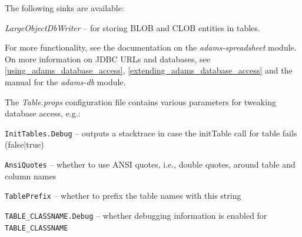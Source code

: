 \noindent The following sinks are available:
\begin{tight_itemize}
  \item \textit{LargeObjectDbWriter} -- for storing BLOB and CLOB entities in tables.
\end{tight_itemize}

For more functionality, see the documentation on the \textit{adams-spreadsheet}
module. On more information on JDBC URLs and databases, see \ref{using_adams_database_access},
\ref{extending_adams_database_access} and the manual for the \textit{adams-db} module.

The \textit{Table.props} configuration file contains various parameters for
tweaking database access, e.g.:
\begin{tight_itemize}
    \item \texttt{InitTables.Debug} -- outputs a stacktrace in case the initTable call for table fails (false|true)
    \item \texttt{AnsiQuotes} -- whether to use ANSI quotes, i.e., double quotes, around table and column names
    \item \texttt{TablePrefix} -- whether to prefix the table names with this string
    \item \texttt{TABLE\_CLASSNAME.Debug} -- whether debugging information is enabled for \texttt{TABLE\_CLASSNAME}
\end{tight_itemize}


\clearpage
